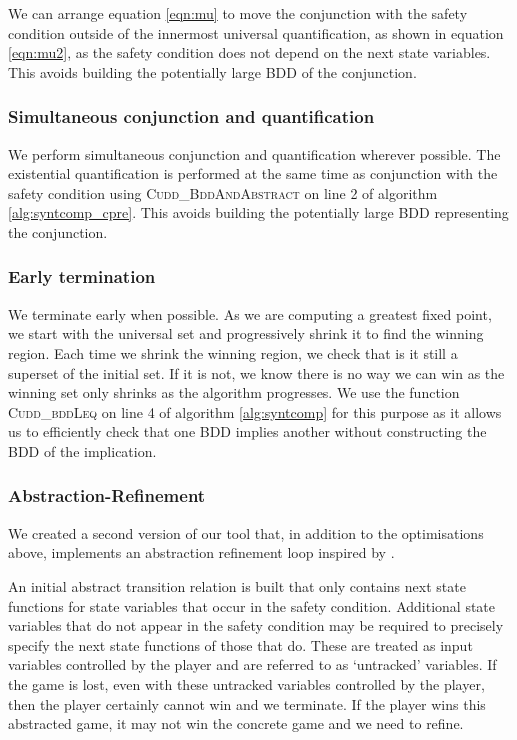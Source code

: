 We can arrange equation \ref{eqn:mu} to move the conjunction with the safety condition outside of the innermost universal quantification, as shown in equation \ref{eqn:mu2}, as the safety condition does not depend on the next state variables. This avoids building the potentially large BDD of the conjunction.

\subsubsection{Simultaneous conjunction and quantification}
We perform simultaneous conjunction and quantification wherever possible. The existential quantification is performed at the same time as conjunction with the safety condition using \textsc{Cudd\_BddAndAbstract} on line 2 of algorithm \ref{alg:syntcomp_cpre}. This avoids building the potentially large BDD representing the conjunction.

\subsubsection{Early termination}
We terminate early when possible. As we are computing a greatest fixed point, we start with the universal set and progressively shrink it to find the winning region. Each time we shrink the winning region, we check that is it still a superset of the initial set. If it is not, we know there is no way we can win as the winning set only shrinks as the algorithm progresses. We use the function \textsc{Cudd\_bddLeq} on line 4 of algorithm \ref{alg:syntcomp} for this purpose as it allows us to efficiently check that one BDD implies another without constructing the BDD of the implication.

\subsubsection{Abstraction-Refinement}

We created a second version of our tool that, in addition to the optimisations above, implements an abstraction refinement loop inspired by \cite{dealfaro}. 

An initial abstract transition relation is built that only contains next state functions for state variables that occur in the safety condition. Additional state variables that do not appear in the safety condition may be required to precisely specify the next state functions of those that do. These are treated as input variables controlled by the player and are referred to as `untracked' variables. If the game is lost, even with these untracked variables controlled by the player, then the player certainly cannot win and we terminate. If the player wins this abstracted game, it may not win the concrete game and we need to refine.

